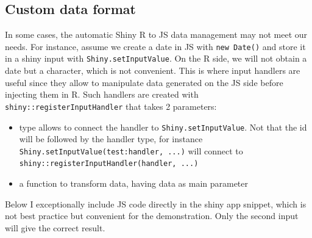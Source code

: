 \documentclass[
]{book}
\providecommand{\tightlist}{%
  \setlength{\itemsep}{0pt}\setlength{\parskip}{0pt}}
\begin{document}
\hypertarget{custom-data-format}{%
\subsection{Custom data format}\label{custom-data-format}}

In some cases, the automatic Shiny R to JS data management may not meet our needs. For instance, assume we create a date in JS with \texttt{new\ Date()} and store it in a shiny input with \texttt{Shiny.setInputValue}. On the R side, we will not obtain a date but a character, which is not convenient. This is where input handlers are useful since they allow to manipulate data generated on the JS side before injecting them in R. Such handlers are created with \texttt{shiny::registerInputHandler} that takes 2 parameters:

\begin{itemize}
\tightlist
\item
  type allows to connect the handler to \texttt{Shiny.setInputValue}. Not that the id will be followed by the handler type, for instance \texttt{Shiny.setInputValue(\textquotesingle{}test:handler\textquotesingle{},\ ...)} will connect to \texttt{shiny::registerInputHandler(\textquotesingle{}handler\textquotesingle{},\ ...)}
\item
  a function to transform data, having data as main parameter
\end{itemize}

Below I exceptionally include JS code directly in the shiny app snippet, which is not best practice but convenient for the demonstration. Only the second input will give the correct result.
\end{document}
